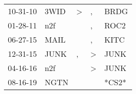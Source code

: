 \begin{supertabular}{p{0.07\textwidth}p{0.06\textwidth}p{0.02\textwidth}p{0.02\textwidth}p{0.06\textwidth}}
 10-31-10\textsuperscript{} &  3WID\textsuperscript{} &  \textgreater &             , &  BRDG\textsuperscript{} \\
 01-28-11\textsuperscript{} &   n2f\textsuperscript{} &               &             , &  ROC2\textsuperscript{} \\
 06-27-15\textsuperscript{} &  MAIL\textsuperscript{} &               &             , &  KITC\textsuperscript{} \\
 12-31-15\textsuperscript{} &  JUNK\textsuperscript{} &             , &  \textgreater &  JUNK\textsuperscript{} \\
 04-16-16\textsuperscript{} &   n2f\textsuperscript{} &               &  \textgreater &  JUNK\textsuperscript{} \\
 08-16-19\textsuperscript{} &  NGTN\textsuperscript{} &               &               &                   *CS2* \\
\end{supertabular}
